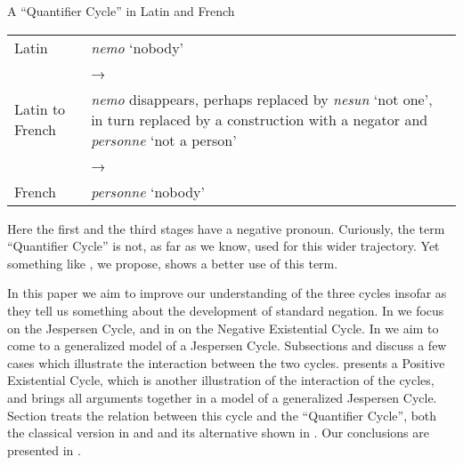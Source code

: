 ﻿\documentclass[output=paper,draft,draftmode,colorlinks,citecolor=brown]{langscibook}
\begin{document}
\begin{exe}\ex\label{ex:int-qc-latin}
A ``Quantifier Cycle'' in Latin and French\\[1ex]
%
\begin{tabularx}{.8\textwidth}{@{} l Q @{}}
Latin               &   \textit{nemo} `nobody'\\
                    & → \\
Latin to French     &\textit{nemo} disappears,
  perhaps replaced by \textit{nesun} `not one', in turn replaced by a
  construction with a negator and \textit{personne} `not a
  person'\\
                    & →\\
French              & \textit{personne} `nobody'
\end{tabularx}
\end{exe}

Here the first and the third stages have a negative pronoun. Curiously,
the term ``Quantifier Cycle'' is not, as far as we know, used for this
wider trajectory. Yet something like , we propose, shows a
better use of this term.

In this paper we aim to improve our understanding of the three cycles insofar as they tell us something about the development of standard negation.
In  we focus on the Jespersen Cycle, and in
 on the Negative Existential Cycle. In
 we aim to come to a generalized model of a Jespersen
Cycle. Subsections  and  discuss a few cases which illustrate the
interaction between the two cycles.  presents a
Positive Existential Cycle, which is another illustration of the
interaction of the cycles, and  brings all arguments
together in a model of a generalized Jespersen Cycle. Section 
treats the relation between this cycle and the ``Quantifier Cycle'', both the
classical version in  and  and its alternative
shown in . Our conclusions are presented in .
\end{document}

